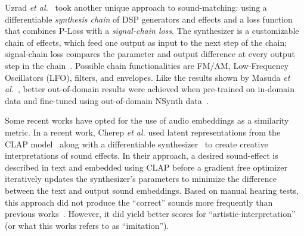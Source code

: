 Uzrad \textit{et al.}~\cite{uzrad2024diffmoog} took another unique approach to sound-matching: using a differentiable \textit{synthesis chain} of DSP generators and effects and a loss function that combines P-Loss with a \textit{signal-chain loss}. The synthesizer is a customizable chain of effects, which feed one output as input to the next step of the chain; signal-chain loss compares the parameter and output difference at every output step in the chain~\cite{uzrad2024diffmoog}. Possible chain functionalities are FM/AM, Low-Frequency Oscillators (\gls{LFO}), filters, and envelopes. Like the results shown by Masuda \textit{et al.}~\cite{masuda2021soundmatch}, better out-of-domain results were achieved when pre-trained on in-domain data and fine-tuned using out-of-domain NSynth data~\cite{engel2017neural}.


Some recent works have opted for the use of audio embeddings as a similarity metric. In a recent work, Cherep \textit{et al.} used latent representations from the CLAP model~\cite{wu2023large} along with a differentiable synthesizer~\cite{synthhaxcherep2023} to create creative interpretations of sound effects. In their approach, a desired sound-effect is described in text and embedded using CLAP before a gradient free optimizer~\cite{evosax2022github} iteratively updates the synthesizer's parameters to minimize the difference between the text and output sound embeddings. Based on manual hearing tests, this approach did not produce the ``correct'' sounds more frequently than previous works~\cite{kreuk2022audiogen}. However, it did yield better scores for ``artistic-interpretation'' (or what this works refers to as ``imitation'').



